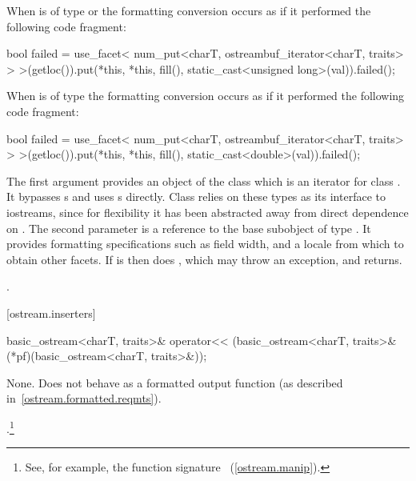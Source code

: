 \begin{itemdescr}
When  is of type
or
the formatting conversion occurs as if it performed the following code fragment:
\begin{codeblock}
bool failed = use_facet<
  num_put<charT, ostreambuf_iterator<charT, traits> >
    >(getloc()).put(*this, *this, fill(),
      static_cast<unsigned long>(val)).failed();
\end{codeblock}

When  is of type
the formatting conversion occurs as if it performed the following code fragment:
\begin{codeblock}
bool failed = use_facet<
  num_put<charT, ostreambuf_iterator<charT, traits> >
    >(getloc()).put(*this, *this, fill(),
      static_cast<double>(val)).failed();
\end{codeblock}

\pnum
The first argument provides an object of the
class which is an iterator for class .
It bypasses
s
and uses
s
directly.
Class
relies on these types as its
interface to iostreams, since for flexibility it has been abstracted
away from direct dependence on
.
The second parameter is a reference to the base subobject of type
.
It provides formatting specifications such as field width, and
a locale from which to obtain other facets.
If
is
then does
,
which may throw an exception, and returns.

\pnum
\returns
{}.
\end{itemdescr}

[ostream.inserters]{}

%
%
\begin{itemdecl}
basic_ostream<charT, traits>& operator<<
    (basic_ostream<charT, traits>& (*pf)(basic_ostream<charT, traits>&));
\end{itemdecl}

\begin{itemdescr}
\pnum
\effects
None.
Does not behave as a formatted output function (as described
in~\ref{ostream.formatted.reqmts}).

\pnum
\returns
{}.\footnote{See, for example, the function signature
%
~(\ref{ostream.manip}).}
\end{itemdescr}

